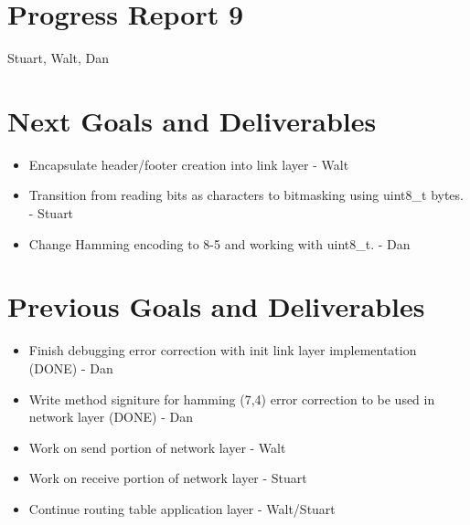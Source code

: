 \documentclass{article}
\begin{document}
\section*{Progress Report 9}
Stuart, Walt, Dan

\section*{Next Goals and Deliverables}
\begin{itemize}
    \item Encapsulate header/footer creation into link layer - Walt
    \item Transition from reading bits as characters to bitmasking using uint8_t bytes. - Stuart
    \item Change Hamming encoding to 8-5 and working with uint8_t. - Dan
\end{itemize}

\section*{Previous Goals and Deliverables}
\begin{itemize}
    \item Finish debugging error correction with init link layer implementation (DONE) - Dan
    \item Write method signiture for hamming (7,4) error correction to be used in network layer (DONE) - Dan
    \item Work on send portion of network layer - Walt
    \item Work on receive portion of network layer - Stuart
    \item Continue routing table application layer - Walt/Stuart
\end{itemize}

\end{document}
